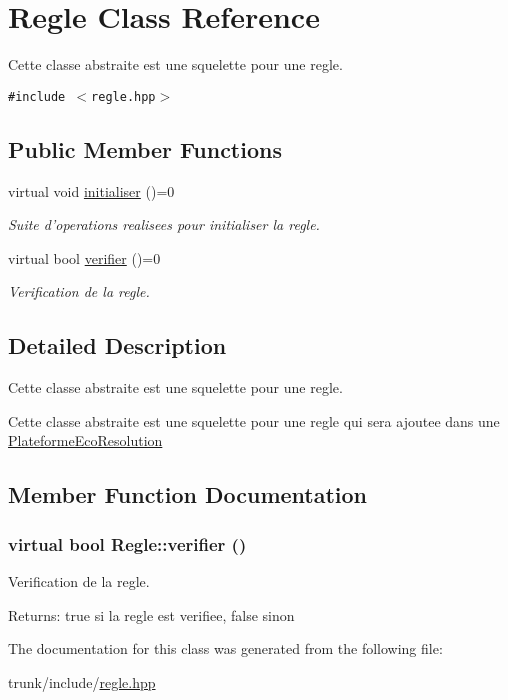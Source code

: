 \hypertarget{classRegle}{
\section{Regle Class Reference}
\label{classRegle}
}
Cette classe abstraite est une squelette pour une regle.  


{\tt \#include $<$regle.hpp$>$}

\subsection*{Public Member Functions}
\begin{CompactItemize}
\item 
\hypertarget{classRegle_b9a0850b2a83f2f0a8deaac82c4500c0}{
virtual void \hyperlink{classRegle_b9a0850b2a83f2f0a8deaac82c4500c0}{initialiser} ()=0}
\label{classRegle_b9a0850b2a83f2f0a8deaac82c4500c0}

\begin{CompactList}\small\item\em Suite d'operations realisees pour initialiser la regle. \item\end{CompactList}\item 
virtual bool \hyperlink{classRegle_4b3de9a64ec0e948e9177026afcc073d}{verifier} ()=0
\begin{CompactList}\small\item\em Verification de la regle. \item\end{CompactList}\end{CompactItemize}


\subsection{Detailed Description}
Cette classe abstraite est une squelette pour une regle. 

Cette classe abstraite est une squelette pour une regle qui sera ajoutee dans une \hyperlink{classPlateformeEcoResolution}{PlateformeEcoResolution} 

\subsection{Member Function Documentation}
\hypertarget{classRegle_4b3de9a64ec0e948e9177026afcc073d}{
\subsubsection[{verifier}]{\setlength{\rightskip}{0pt plus 5cm}virtual bool Regle::verifier ()}}
\label{classRegle_4b3de9a64ec0e948e9177026afcc073d}


Verification de la regle. 

\begin{Desc}
\item[Returns:]true si la regle est verifiee, false sinon \end{Desc}


The documentation for this class was generated from the following file:\begin{CompactItemize}
\item 
trunk/include/\hyperlink{regle_8hpp}{regle.hpp}\end{CompactItemize}
